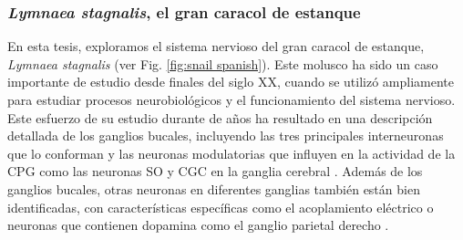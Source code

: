 \subsubsection{\textit{Lymnaea stagnalis}, el gran caracol de estanque}
En esta tesis, exploramos el sistema nervioso del gran caracol de estanque, \textit{Lymnaea stagnalis} (ver Fig. \ref{fig:snail spanish}). Este molusco ha sido un caso importante de estudio desde finales del siglo XX, cuando se utilizó ampliamente para estudiar procesos neurobiológicos y el funcionamiento del sistema nervioso. Este esfuerzo de su estudio durante de años ha resultado en una descripción detallada de los ganglios bucales, incluyendo las tres principales interneuronas que lo conforman \parencite{benjamin_snail_1989,benjamin_morphology_1979,rose_relationship_1979,brierley_behavioral_1997} y las neuronas modulatorias que influyen en la actividad de la CPG como las neuronas SO y CGC en la ganglia cerebral \parencite{rose_interneuronal_1981,mccrohan_patterns_1980,kemenes_multiple_2001}. Además de los ganglios bucales, otras neuronas en diferentes ganglias también están bien identificadas, con características específicas como el acoplamiento eléctrico o neuronas que contienen dopamina como el ganglio parietal derecho \parencite{benjamin_electrotonic_1986,winlow_multiple_1981}.


